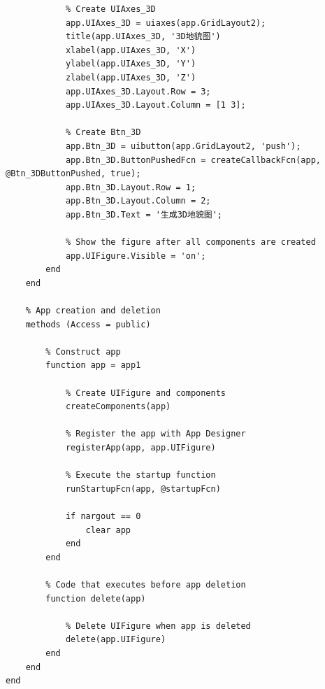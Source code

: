 \documentclass[UTF8, a4paper, 11pt]{ctexart}
\begin{document}
\begin{lstlisting}
            % Create UIAxes_3D
            app.UIAxes_3D = uiaxes(app.GridLayout2);
            title(app.UIAxes_3D, '3D地貌图')
            xlabel(app.UIAxes_3D, 'X')
            ylabel(app.UIAxes_3D, 'Y')
            zlabel(app.UIAxes_3D, 'Z')
            app.UIAxes_3D.Layout.Row = 3;
            app.UIAxes_3D.Layout.Column = [1 3];

            % Create Btn_3D
            app.Btn_3D = uibutton(app.GridLayout2, 'push');
            app.Btn_3D.ButtonPushedFcn = createCallbackFcn(app, @Btn_3DButtonPushed, true);
            app.Btn_3D.Layout.Row = 1;
            app.Btn_3D.Layout.Column = 2;
            app.Btn_3D.Text = '生成3D地貌图';

            % Show the figure after all components are created
            app.UIFigure.Visible = 'on';
        end
    end

    % App creation and deletion
    methods (Access = public)

        % Construct app
        function app = app1

            % Create UIFigure and components
            createComponents(app)

            % Register the app with App Designer
            registerApp(app, app.UIFigure)

            % Execute the startup function
            runStartupFcn(app, @startupFcn)

            if nargout == 0
                clear app
            end
        end

        % Code that executes before app deletion
        function delete(app)

            % Delete UIFigure when app is deleted
            delete(app.UIFigure)
        end
    end
end
\end{lstlisting}
\end{document}
